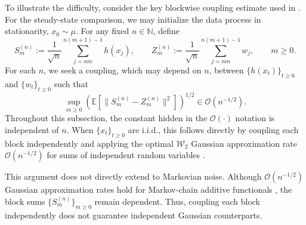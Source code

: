 \documentclass[11pt,letterpaper]{article}
\theoremstyle{plain}
\theoremstyle{definition}
\theoremstyle{remark}
\newcommand{\E}{\mathbb{E}}
\begin{document}
To illustrate the difficulty, consider the key blockwise coupling estimate used in \cite{zhang2024prelimit}. For the steady-state comparison, we may initialize the data process in stationarity, \(x_0\sim\mu\). For any fixed \(n\in\mathbb N\), define 
\begin{equation}\label{eq:def_block_sum}
    S_m^{(n)}
    :=
    \frac{1}{\sqrt n}
    \sum_{j=nm}^{n(m+1)-1} h(x_j),
    \qquad
    Z_m^{(n)}
    :=
    \frac{1}{\sqrt n}
    \sum_{j=nm}^{n(m+1)-1} w_j,
    \qquad m\geq0.
\end{equation}
For each \(n\), we seek a coupling, which may depend on \(n\), between
\(\{h(x_t)\}_{t\geq0}\) and \(\{w_t\}_{t\geq0}\) such that
\[
    \sup_{m\geq0}
    \left(
        \E\!\left[
            \bigl\|S_m^{(n)}-Z_m^{(n)}\bigr\|^2
        \right]
    \right)^{1/2}
   \in 
    \mathcal O\!\left(n^{-1/2}\right).
\]
Throughout this subsection, the constant hidden in the
\(\mathcal O(\cdot)\) notation is independent of \(n\). When \(\{x_t\}_{t\geq0}\) are i.i.d., this follows directly by coupling each block independently and applying the optimal \(\mathcal W_2\) Gaussian approximation rate \(\mathcal O(n^{-1/2})\) for sums of independent random variables \cite{bonis2020stein}.


This argument does not directly extend to Markovian noise. Although
\(\mathcal O(n^{-1/2})\) Gaussian approximation rates hold for Markov-chain
additive functionals \cite{zhang2026martingale}, the block sums
\(\{S_m^{(n)}\}_{m\geq0}\) remain dependent. Thus, coupling each block
independently does not guarantee independent Gaussian counterparts.
\end{document}
